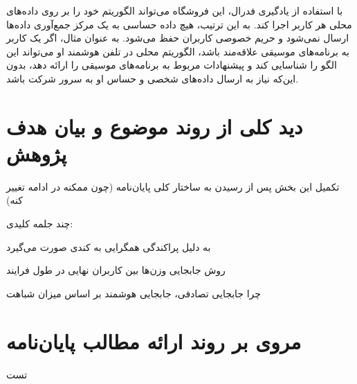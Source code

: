 با استفاده از یادگیری فدرال، این فروشگاه می‌تواند الگوریتم خود را بر روی داده‌های محلی هر کاربر اجرا کند. به این ترتیب، هیچ داده حساسی به یک مرکز جمع‌آوری داده‌ها ارسال نمی‌شود و حریم خصوصی کاربران حفظ می‌شود. به عنوان مثال، اگر یک کاربر به برنامه‌های موسیقی علاقه‌مند باشد، الگوریتم محلی در تلفن هوشمند او می‌تواند این الگو را شناسایی کند و پیشنهادات مربوط به برنامه‌های موسیقی را ارائه دهد، بدون این‌که نیاز به ارسال داده‌های شخصی و حساس او به سرور شرکت باشد.


\section{دید کلی از روند موضوع و بیان هدف پژوهش}
تکمیل این بخش پس از رسیدن به ساختار کلی پایان‌نامه (چون ممکنه در ادامه تغییر کنه)

چند جلمه کلیدی:

به دلیل پراکندگی همگرایی به کندی صورت می‌گیرد

روش جابجایی وزن‌ها بین کاربران نهایی در طول فرایند

چرا جابجایی تصادفی، جابجایی هوشمند بر اساس میزان شباهت

\section{مروی بر روند ارائه مطالب پایان‌نامه}
تست

